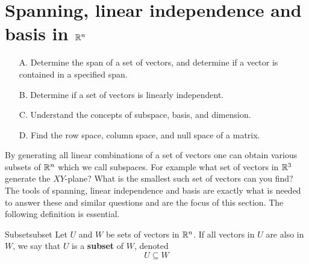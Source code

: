 \newpage
\section{Spanning, linear independence and basis in \texorpdfstring{$\mathbb{R}^{n}$}{Rn}}

\begin{outcome}

\begin{enumerate}
\item[A.] Determine the span of a set of vectors, and determine if a vector is contained in a specified span.

\item[B.] Determine if a set of vectors is linearly independent.

\item[C.] Understand the concepts of subspace, basis, and dimension.

\item[D.] Find the row space, column space, and null space of a matrix.
\end{enumerate}
\end{outcome}

By generating all linear combinations of a set of vectors one can
obtain various subsets of $\mathbb{R}^{n}$ which we call
subspaces. For example what set of vectors in $\mathbb{R}^{3}$
generate the $XY$-plane? What is the smallest such set of vectors can
you find? The tools of spanning, linear independence and basis are
exactly what is needed to answer these and similar questions and are the focus of this section. The following definition is essential.

\begin{definition}{Subset}{subset}
Let $U$ and $W$ be sets of vectors in $\mathbb{R}^n$. If all vectors in $U$ are also in $W$, we say that $U$ is a \textbf{subset} of $W$, denoted 
\[
U \subseteq W
\]
\end{definition}